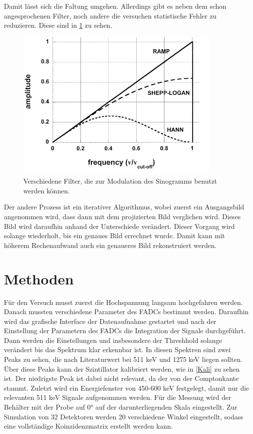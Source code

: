 Damit lässt sich die Faltung umgehen. Allerdings gibt es neben dem schon angesprochenen Filter, noch andere die versuchen statistische Fehler zu reduzieren. Diese sind in \cref{Filter} zu sehen.


\begin{figure}[h!]
	\centering
	\includegraphics[width=0.9\textwidth]{Filter.png}
	\caption{Verschiedene Filter, die zur Modulation des Sinogramms benutzt werden können.}
	\label{Filter}
\end{figure}

Der andere Prozess ist ein iterativer Algorithmus, wobei zuerst ein Ausgangsbild angenommen wird, dass dann mit dem projizierten Bild verglichen wird. Dieses Bild wird daraufhin anhand der Unterschiede verändert. Dieser Vorgang wird solange wiederholt, bis ein genaues Bild errechnet wurde. Damit kann mit höherem Rechenaufwand auch ein genaueres Bild rekonstruiert werden.

\section{Methoden}
Für den Versuch musst zuerst die Hochspannung langsam hochgefahren werden. Danach mussten verschiedene Parameter des FADCs bestimmt werden. 
Daraufhin wird das grafische Interface der Datenaufnahme gestartet und nach der Einstellung der Parametern des FADCs die Integration der Signale durchgeführt. Dann werden die Einstellungen und insbesondere der Threshhold solange verändert bis das Spektrum klar erkennbar ist. In diesen Spektren sind zwei Peaks zu sehen, die nach Literaturwert bei 511 keV und 1275 keV liegen sollten. Über diese Peaks kann der Szintillator kalibriert werden, wie in \cref{Kali} zu sehen ist. Der niedrigste Peak ist dabei nicht relevant, da der von der Comptonkante stammt.
Zuletzt wird ein Energiefenster von 450-600 keV festgelegt, damit nur die relevanten 511 keV Signale aufgenommen werden. Für die Messung wird der Behälter mit der Probe auf 0° auf der darunterliegenden Skala eingestellt. Zur Simulation von 32 Detektoren werden 20 verschiedene Winkel eingestellt, sodass eine vollständige Koinzidenzmatrix erstellt werden kann. 

